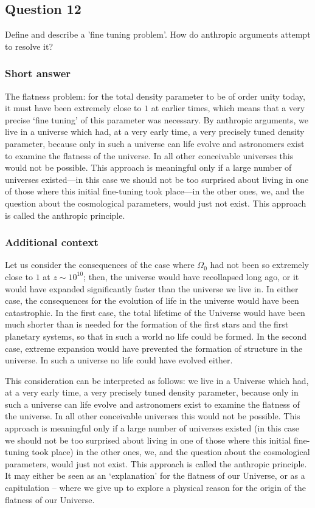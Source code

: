 \documentclass[a4paper,11pt]{article}
\begin{document}
\newpage
\subsection{Question 12}

Define and describe a 'fine tuning problem'. How do anthropic arguments attempt to resolve it?

\subsubsection{Short answer}

The flatness problem: for the total density parameter to be of order unity today, it must have been extremely close to $1$ at earlier times, which means that a very precise `fine tuning' of this parameter was necessary. By anthropic arguments, we live in a universe which had, at a very early time, a very precisely tuned density parameter, because only in such a universe can life evolve and astronomers exist to examine the flatness of the universe. In all other conceivable universes this would not be possible. This approach is meaningful only if a large number of universes existed—in this case we should not be too surprised about living in one of those where this initial fine-tuning took place—in the other ones, we, and the question about the cosmological parameters, would just not exist. This approach is called the anthropic principle.

\subsubsection{Additional context}

Let us consider the consequences of the case where $\Omega_0$ had not been so extremely close to $1$ at $z\sim10^{10}$; then, the universe would have recollapsed long ago, or it would have expanded significantly faster than the universe we live in. In either case, the consequences for the evolution of life in the universe would have been catastrophic. In the first case, the total lifetime of the Universe would have been much shorter than is needed for the formation of the first stars and the first planetary systems, so that in such a world no life could be formed. In the second case, extreme expansion would have prevented the formation of structure in the universe. In such a universe no life could have evolved either. 

{\noindent}This consideration can be interpreted as follows: we live in a Universe which had, at a very early time, a very precisely tuned density parameter, because only in such a universe can life evolve and astronomers exist to examine the flatness of the universe. In all other conceivable universes this would not be possible. This approach is meaningful only if a large number of universes existed (in this case we should not be too surprised about living in one of those where this initial fine-tuning took place) in the other ones, we, and the question about the cosmological parameters, would just not exist. This approach is called the anthropic principle. It may either be seen as an `explanation' for the flatness of our Universe, or as a capitulation -- where we give up to explore a physical reason for the origin of the flatness of our Universe.
\end{document}
